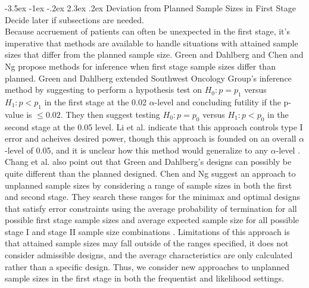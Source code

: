 \documentclass[12pt]{report}\usepackage[]{graphicx}\usepackage[]{color}
\makeatletter
\newlength{\li}\setlength{\li}{14.48pt}
\newlength{\di}\setlength{\di}{-3.5mm}
\renewcommand\section{ \@startsection {section}{1}{\z@}%
                                   {-3.5ex \@plus -1ex \@minus -.2ex}%
                                   {2.3ex \@plus.2ex}%
                                   {\centering\large\fontfamily{qcs}\selectfont}}
\makeatother
\begin{document}
\section{Deviation from Planned Sample Sizes in First Stage}
Decide later if subsections are needed.  \\
\newline
\indent Because accruement of patients can often be unexpected in the first stage, it's imperative that methods are available to handle situations with attained sample sizes that differ from the planned sample size. Green and Dahlberg \cite{Green} and Chen and Ng \cite{Chen} propose methods for inference when first stage sample sizes differ than planned. Green and Dahlberg extended Southwest Oncology Group's inference method by suggesting to perform a hypothesis test on $H_0: p=p_1$ versus $H_1: p < p_1$ in the first stage at the 0.02 $\alpha$-level and concluding futility if the p-value is $\leq 0.02$. They then suggest testing $H_0: p=p_0$ versus $H_1: p < p_0$ in the second stage at the 0.05 level. Li et al. indicate that this approach controls type I error and acheives desired power, though this approach is founded on an overall $\alpha$-level of 0.05, and it is unclear how this method would generalize to any $\alpha$-level \cite{Li}. Chang et al. also point out that Green and Dahlberg's designs can possibly be quite different than the planned designed. Chen and Ng suggest an approach to unplanned sample sizes by considering a range of sample sizes in both the first and second stage. They search these ranges for the minimax and optimal designs that satisfy error constraints using the average probability of termination for all possible first stage sample sizes and average expected sample size for all possible stage I and stage II sample size combinations \cite{Chen}. Limitations of this approach is that attained sample sizes may fall outside of the ranges specified, it does not consider admissible designs, and the average characteristics are only calculated rather than a specific design. Thus, we consider new approaches to unplanned sample sizes in the first stage in both the frequentist and likelihood settings.  

\end{document}
